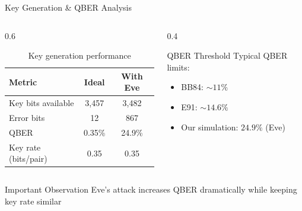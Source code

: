 \documentclass[10pt]{beamer}
\begin{document}
\begin{frame}{Key Generation \& QBER Analysis}
    \begin{columns}
        \begin{column}{0.6\textwidth}
            \begin{table}[h]
                \centering
                \begin{tabular}{lcc}
                    \toprule
                    \textbf{Metric} & \textbf{Ideal} & \textbf{With Eve} \\
                    \midrule
                    Key bits available & 3,457 & 3,482 \\
                    Error bits & 12 & 867 \\
                    QBER & 0.35\% & 24.9\% \\
                    Key rate (bits/pair) & 0.35 & 0.35 \\
                    \bottomrule
                \end{tabular}
                \caption{Key generation performance}
            \end{table}
        \end{column}
        
        \begin{column}{0.4\textwidth}
            \begin{block}{QBER Threshold}
                Typical QBER limits:
                \begin{itemize}
                    \item BB84: $\sim 11\%$
                    \item E91: $\sim 14.6\%$
                    \item Our simulation: $24.9\%$ (Eve)
                \end{itemize}
            \end{block}
        \end{column}
    \end{columns}
    
    \vspace{3mm}
    \begin{alertblock}{Important Observation}
        Eve's attack increases QBER dramatically while keeping key rate similar
    \end{alertblock}
\end{frame}
\end{document}

